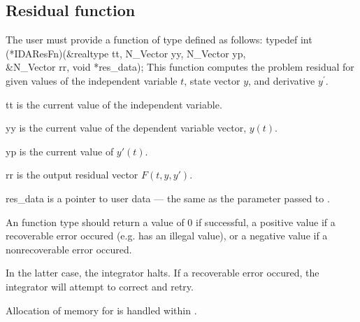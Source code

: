 {\subsection{Residual function}\label{ss:resFn}
The user must provide a function of type  defined as follows:
{
  typedef int (*IDAResFn)(&realtype tt, N\_Vector yy, N\_Vector yp,  \\
                          &N\_Vector rr, void *res\_data);
}
{
  This function computes the problem residual for given values
  of the independent variable $t$, state vector $y$, and derivative $y^\prime$.
}
{
  \begin{args}
  \item[tt]
    is the current value of the independent variable.
  \item[yy]
    is the current value of the dependent variable vector, $y(t)$.
  \item[yp]
    is the current value of $y'(t)$.
  \item[rr]
    is the output residual vector $F(t,y,y')$.
  \item[res\_data]
    is a pointer to user data --- the same as the       
    parameter passed to .   
  \end{args}
}
{
  An  function type should return a value of $0$ if successful, 
  a positive value if a recoverable error occured (e.g.  has an illegal
  value), or a negative value if a nonrecoverable error occured. 

  In the latter case, the integrator halts. 
  If a recoverable error occured, the integrator will attempt to correct and retry.
}
{
  Allocation of memory for  is handled within {\ida}.
}
}
